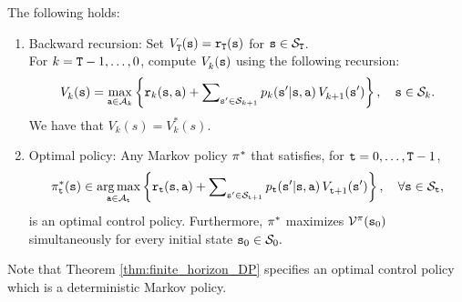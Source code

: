 \begin{theorem}\label{thm:finite_horizon_DP}
The following holds:
\begin{enumerate}
\item
Backward recursion:  Set $V_{\tt T}^{}({\tt s}) = {{\tt r}_{\tt T}}({\tt s})$ for ${\tt s}\in {\mathcal{S}_{\tt T}}$.\\
     For $k = {\tt T} -1, \ldots ,0$, compute $V_k^{}({\tt s})$ using the following recursion:
\[V_k^{}({\tt s}) = \mathop {\max }\limits_{{\tt a} \in {\mathcal{A}_k}} \left\{ {{{\tt r}_k}({\tt s},{\tt a}) + \sum\nolimits_{{\tt s}' \in {\mathcal{S}_{k + 1}}} {{p_k}({\tt s}'|{\tt s},{\tt a})\,} V_{k + 1}^{}({\tt s}')} \right\},  \quad  {\tt s} \in {\mathcal{S}_k}.\]
We have that $V_k(s)=V^*_k(s)$.
\item
Optimal policy: Any Markov policy ${\pi ^*}$ that satisfies, for ${\tt t} = 0, \ldots ,{\tt T} -1$,
\[\pi _{\tt t}^*({\tt s}) \in \mathop {\arg \max }\limits_{{\tt a} \in {\mathcal{A}_{\tt t}}} \left\{ {{{\tt r}_{\tt t}}({\tt s},{\tt a}) + \sum\nolimits_{{\tt s}' \in {\mathcal{S}_{{\tt t}+ 1}}} {{p_{\tt t}}({\tt s}'|{\tt s},{\tt a})\,} V_{{\tt t} + 1}^{}({\tt s}')} \right\},\quad \forall {\tt s} \in {\mathcal{S}_{\tt t}},\]
is an optimal control policy. Furthermore, ${\pi ^*}$ maximizes
${\mathcal{V}^\pi }({{\tt s}_0})$ simultaneously for every initial state
${{\tt s}_0} \in {\mathcal{S}_0}.$
\end{enumerate}
\end{theorem}
Note that Theorem \ref{thm:finite_horizon_DP} specifies an optimal control policy which is a deterministic Markov policy.

